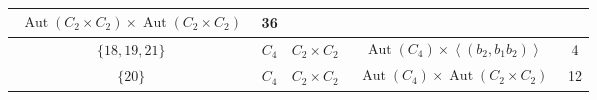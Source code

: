 \documentclass[dvipsnames]{article}
\theoremstyle{definition}
\theoremstyle{remark}
\DeclareMathOperator{\Aut}{Aut}
\begin{document}
\begin{longtable}{ |c|c|c|c|c|}
\begin{minipage}{3.5cm}
{        \begin{align*}
            \Aut(C_2\times C_2) \times \Aut(C_2\times C_2)
        \end{align*}
        \vspace{-5mm}
        }
    \end{minipage}
    &36\\
    \hline
    $\{18,19,21\}$
    &
    $C_4$
    &
    $C_2\times C_2$
    &
    \begin{minipage}{3.5cm}
        {
        \vspace{-2.5mm}
        \begin{align*}
            \Aut(C_4) \times
            \left\langle
            (b_2, b_1b_2)
            \right\rangle
        \end{align*}
        \vspace{-5mm}
        }
    \end{minipage}
    & 4 \\
    \hline
    $\{20\}$
    &
    $C_4$
    &
    $C_2\times C_2$
    &
    \begin{minipage}{3.5cm}
        {
        \vspace{-2.5mm}
        \begin{align*}
            \Aut(C_4) \times \Aut(C_2\times C_2)
        \end{align*}
        \vspace{-5mm}
        }
    \end{minipage}
    & 12\\
    \hline
    \end{longtable}
\end{document}
